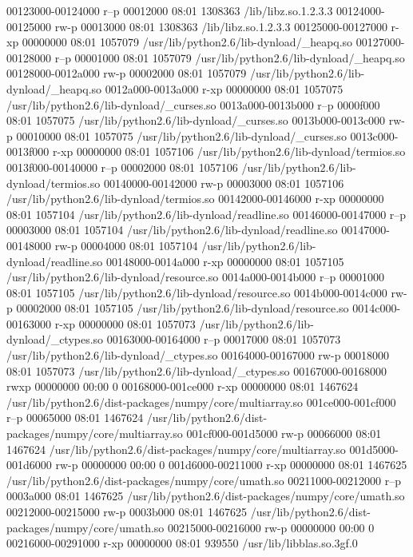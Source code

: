 00123000-00124000 r--p 00012000 08:01 1308363    /lib/libz.so.1.2.3.3
00124000-00125000 rw-p 00013000 08:01 1308363    /lib/libz.so.1.2.3.3
00125000-00127000 r-xp 00000000 08:01 1057079    /usr/lib/python2.6/lib-dynload/_heapq.so
00127000-00128000 r--p 00001000 08:01 1057079    /usr/lib/python2.6/lib-dynload/_heapq.so
00128000-0012a000 rw-p 00002000 08:01 1057079    /usr/lib/python2.6/lib-dynload/_heapq.so
0012a000-0013a000 r-xp 00000000 08:01 1057075    /usr/lib/python2.6/lib-dynload/_curses.so
0013a000-0013b000 r--p 0000f000 08:01 1057075    /usr/lib/python2.6/lib-dynload/_curses.so
0013b000-0013c000 rw-p 00010000 08:01 1057075    /usr/lib/python2.6/lib-dynload/_curses.so
0013c000-0013f000 r-xp 00000000 08:01 1057106    /usr/lib/python2.6/lib-dynload/termios.so
0013f000-00140000 r--p 00002000 08:01 1057106    /usr/lib/python2.6/lib-dynload/termios.so
00140000-00142000 rw-p 00003000 08:01 1057106    /usr/lib/python2.6/lib-dynload/termios.so
00142000-00146000 r-xp 00000000 08:01 1057104    /usr/lib/python2.6/lib-dynload/readline.so
00146000-00147000 r--p 00003000 08:01 1057104    /usr/lib/python2.6/lib-dynload/readline.so
00147000-00148000 rw-p 00004000 08:01 1057104    /usr/lib/python2.6/lib-dynload/readline.so
00148000-0014a000 r-xp 00000000 08:01 1057105    /usr/lib/python2.6/lib-dynload/resource.so
0014a000-0014b000 r--p 00001000 08:01 1057105    /usr/lib/python2.6/lib-dynload/resource.so
0014b000-0014c000 rw-p 00002000 08:01 1057105    /usr/lib/python2.6/lib-dynload/resource.so
0014c000-00163000 r-xp 00000000 08:01 1057073    /usr/lib/python2.6/lib-dynload/_ctypes.so
00163000-00164000 r--p 00017000 08:01 1057073    /usr/lib/python2.6/lib-dynload/_ctypes.so
00164000-00167000 rw-p 00018000 08:01 1057073    /usr/lib/python2.6/lib-dynload/_ctypes.so
00167000-00168000 rwxp 00000000 00:00 0 
00168000-001ce000 r-xp 00000000 08:01 1467624    /usr/lib/python2.6/dist-packages/numpy/core/multiarray.so
001ce000-001cf000 r--p 00065000 08:01 1467624    /usr/lib/python2.6/dist-packages/numpy/core/multiarray.so
001cf000-001d5000 rw-p 00066000 08:01 1467624    /usr/lib/python2.6/dist-packages/numpy/core/multiarray.so
001d5000-001d6000 rw-p 00000000 00:00 0 
001d6000-00211000 r-xp 00000000 08:01 1467625    /usr/lib/python2.6/dist-packages/numpy/core/umath.so
00211000-00212000 r--p 0003a000 08:01 1467625    /usr/lib/python2.6/dist-packages/numpy/core/umath.so
00212000-00215000 rw-p 0003b000 08:01 1467625    /usr/lib/python2.6/dist-packages/numpy/core/umath.so
00215000-00216000 rw-p 00000000 00:00 0 
00216000-00291000 r-xp 00000000 08:01 939550     /usr/lib/libblas.so.3gf.0
